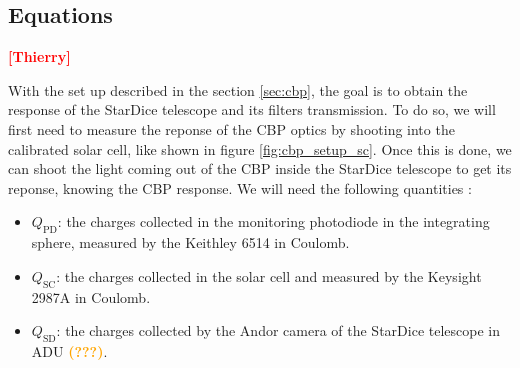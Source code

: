 \documentclass[onecolumn]{aa}
\newcommand{\QSD}{Q_{\mathrm{SD}}}
\newcommand{\QPD}{Q_{\mathrm{PD}}}
\newcommand{\QSC}{Q_{\mathrm{SC}}}
\newcommand{\todo}[1]{\textbf{\textcolor{red}{[#1]}}\xspace}
\newcommand{\com}[1]{\textbf{\textcolor{orange}{(#1)}}\xspace}
\begin{document}
  

\subsection{Equations}

\todo{Thierry}


With the set up described in the section \ref{sec:cbp}, the goal is to obtain the response of the StarDice telescope and its filters transmission. To do so, we will first need to measure the reponse of the CBP optics by shooting into the calibrated solar cell, like shown in figure \ref{fig:cbp_setup_sc}. Once this is done, we can shoot the light coming out of the CBP inside the StarDice telescope to get its reponse, knowing the CBP response. We will need the following quantities : 

\begin{itemize}
    \item $\QPD$: the charges collected in the monitoring photodiode in the integrating sphere, measured by the Keithley 6514 in Coulomb.
    \item $\QSC$: the charges collected in the solar cell and measured by the Keysight 2987A in Coulomb.
    \item $\QSD$: the charges collected by the Andor camera of the StarDice telescope in ADU \com{???}.
\end{itemize}
\end{document}
